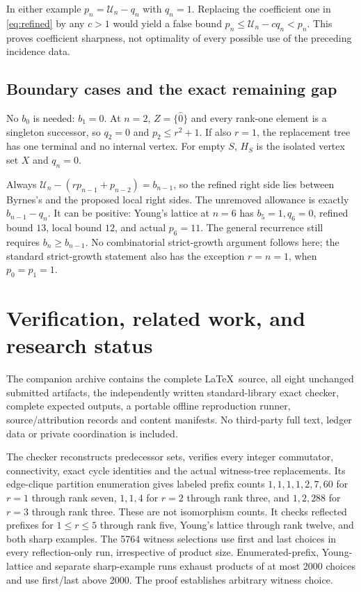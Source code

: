 \documentclass[11pt]{article}
\theoremstyle{remark}
\newcommand{\By}{\mathcal U}
\begin{document}
In either example $p_n=\By_n-q_n$ with $q_n=1$. Replacing the coefficient
one in \eqref{eq:refined} by any $c>1$ would yield a false bound
$p_n\le\By_n-cq_n<p_n$. This proves coefficient sharpness, not optimality
of every possible use of the preceding incidence data.

\subsection*{Boundary cases and the exact remaining gap}
No $b_0$ is needed: $b_1=0$. At $n=2$, $Z=\{\widehat0\}$ and every rank-one
element is a singleton successor, so $q_2=0$ and $p_2\le r^2+1$.
If also $r=1$, the replacement tree has one terminal and no internal vertex.
For empty $S$, $H_S$ is the isolated vertex set $X$ and $q_n=0$.

Always $\By_n-(rp_{n-1}+p_{n-2})=b_{n-1}$, so the refined right side lies
between Byrnes's and the proposed local right sides. The unremoved allowance
is exactly $b_{n-1}-q_n$. It can be positive: Young's lattice at $n=6$ has
$b_5=1,q_6=0$, refined bound $13$, local bound $12$, and actual $p_6=11$.
The general recurrence still requires $b_n\ge b_{n-1}$. No combinatorial
strict-growth argument follows here; the standard strict-growth statement
also has the exception $r=n=1$, when $p_0=p_1=1$.

\newpage
\section{Verification, related work, and research status}
The companion archive contains the complete \LaTeX\ source, all eight
unchanged submitted artifacts, the independently written standard-library
exact checker, complete expected outputs, a portable offline reproduction
runner, source/attribution records and content manifests. No third-party
full text, ledger data or private coordination is included.

The checker reconstructs predecessor sets, verifies every integer commutator,
connectivity, exact cycle identities and the actual witness-tree replacements.
Its edge-clique partition enumeration gives labeled prefix counts
$1,1,1,1,2,7,60$ for $r=1$ through rank seven, $1,1,4$ for $r=2$ through rank
three, and $1,2,288$ for $r=3$ through rank three. These are not isomorphism
counts. It checks reflected prefixes for $1\le r\le5$ through rank five,
Young's lattice through rank twelve, and both sharp examples.
The 5764 witness selections use first and last choices in every reflection-only
run, irrespective of product size. Enumerated-prefix, Young-lattice and separate
sharp-example runs exhaust products of at most 2000 choices and use first/last
above 2000. The proof establishes arbitrary witness choice.
\end{document}
